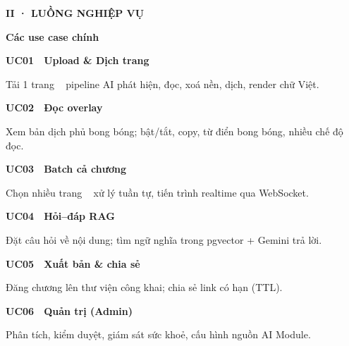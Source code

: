 \documentclass[aspectratio=169,10pt]{beamer}
\newcommand{\kick}[1]{{\headfont\bfseries\footnotesize\textcolor{mred}{\MakeUppercase{#1}}}}
\newcommand{\slidehead}[2]{%
  \kick{#1}\par\vspace{0.6mm}%
  {\headfont\bfseries\LARGE\textcolor{ink}{#2}}\par\vspace{1.2mm}}
\newcommand{\arr}{\textcolor{mred}{\,\raisebox{0.1ex}{$\rightarrow$}\,}}
\begin{document}
\begin{frame}
\slidehead{II · Luồng nghiệp vụ}{Các use case chính}
\vspace{0.5mm}
\begin{tcbraster}[raster columns=2, raster equal height=rows, raster column skip=3mm, raster row skip=2mm]
\begin{tcolorbox}[card]\small{\headfont\bfseries\color{mred}UC01}\ \ {\headfont\bfseries Upload \& Dịch trang}\par\textcolor{slate}{Tải 1 trang \arr\ pipeline AI phát hiện, đọc, xoá nền, dịch, render chữ Việt.}\end{tcolorbox}
\begin{tcolorbox}[card]\small{\headfont\bfseries\color{ink}UC02}\ \ {\headfont\bfseries Đọc overlay}\par\textcolor{slate}{Xem bản dịch phủ bong bóng; bật/tắt, copy, từ điển bong bóng, nhiều chế độ đọc.}\end{tcolorbox}
\begin{tcolorbox}[card]\small{\headfont\bfseries\color{mblue}UC03}\ \ {\headfont\bfseries Batch cả chương}\par\textcolor{slate}{Chọn nhiều trang \arr\ xử lý tuần tự, tiến trình realtime qua WebSocket.}\end{tcolorbox}
\begin{tcolorbox}[card]\small{\headfont\bfseries\color{mgreen}UC04}\ \ {\headfont\bfseries Hỏi–đáp RAG}\par\textcolor{slate}{Đặt câu hỏi về nội dung; tìm ngữ nghĩa trong pgvector + Gemini trả lời.}\end{tcolorbox}
\begin{tcolorbox}[card]\small{\headfont\bfseries\color{gold}UC05}\ \ {\headfont\bfseries Xuất bản \& chia sẻ}\par\textcolor{slate}{Đăng chương lên thư viện công khai; chia sẻ link có hạn (TTL).}\end{tcolorbox}
\begin{tcolorbox}[card]\small{\headfont\bfseries\color{ink2}UC06}\ \ {\headfont\bfseries Quản trị (Admin)}\par\textcolor{slate}{Phân tích, kiểm duyệt, giám sát sức khoẻ, cấu hình nguồn AI Module.}\end{tcolorbox}
\end{tcbraster}
\vspace{1mm}{\footnotesize\textcolor{slate}{Demo tập trung UC01+UC02 (luồng A) và UC03 (luồng B) — đủ yêu cầu $\geq$2 use case.}}
\end{frame}
\end{document}
